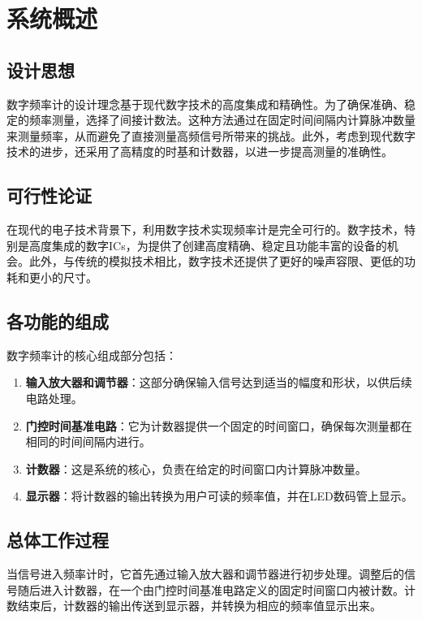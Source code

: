 \documentclass[UTF8,titlepage,a4paper]{ctexart}
\numberwithin{figure}{section}
\begin{document}
\section{系统概述}

\subsection{设计思想}

数字频率计的设计理念基于现代数字技术的高度集成和精确性。为了确保准确、稳定的频率测量，选择了间接计数法。这种方法通过在固定时间间隔内计算脉冲数量来测量频率，从而避免了直接测量高频信号所带来的挑战。此外，考虑到现代数字技术的进步，还采用了高精度的时基和计数器，以进一步提高测量的准确性。

\subsection{可行性论证}

在现代的电子技术背景下，利用数字技术实现频率计是完全可行的。数字技术，特别是高度集成的数字ICs，为提供了创建高度精确、稳定且功能丰富的设备的机会。此外，与传统的模拟技术相比，数字技术还提供了更好的噪声容限、更低的功耗和更小的尺寸。

\subsection{各功能的组成}

数字频率计的核心组成部分包括：

\begin{enumerate}
    \item \textbf{输入放大器和调节器}：这部分确保输入信号达到适当的幅度和形状，以供后续电路处理。
    \item \textbf{门控时间基准电路}：它为计数器提供一个固定的时间窗口，确保每次测量都在相同的时间间隔内进行。
    \item \textbf{计数器}：这是系统的核心，负责在给定的时间窗口内计算脉冲数量。
    \item \textbf{显示器}：将计数器的输出转换为用户可读的频率值，并在LED数码管上显示。
\end{enumerate}

\subsection{总体工作过程}

当信号进入频率计时，它首先通过输入放大器和调节器进行初步处理。调整后的信号随后进入计数器，在一个由门控时间基准电路定义的固定时间窗口内被计数。计数结束后，计数器的输出传送到显示器，并转换为相应的频率值显示出来。
\end{document}
